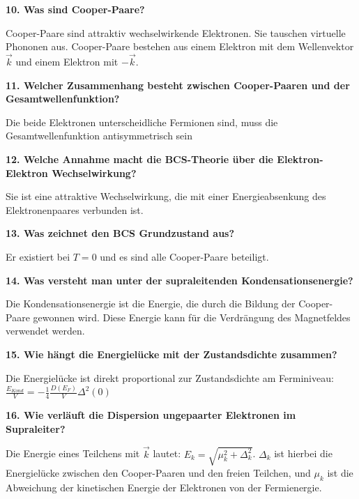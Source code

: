 \noindent\textbf{10. Was sind Cooper-Paare?}\\
\begin{addmargin}[25pt]{0pt}
Cooper-Paare sind attraktiv wechselwirkende Elektronen. Sie tauschen virtuelle Phononen aus. Cooper-Paare bestehen aus einem Elektron mit dem Wellenvektor $\vec{k}$ und einem Elektron mit $-\Vec{k}$.
\end{addmargin}

\noindent\textbf{11. Welcher Zusammenhang besteht zwischen Cooper-Paaren und der Gesamtwellenfunktion?}\\
\begin{addmargin}[25pt]{0pt}
Die beide Elektronen unterscheidliche Fermionen sind, muss die Gesamtwellenfunktion antisymmetrisch sein
\end{addmargin}

\noindent\textbf{12. Welche Annahme macht die BCS-Theorie über die Elektron-Elektron Wechselwirkung?}\\
\begin{addmargin}[25pt]{0pt}
Sie ist eine attraktive Wechselwirkung, die mit einer Energieabsenkung des Elektronenpaares verbunden ist.
\end{addmargin}

\noindent\textbf{13. Was zeichnet den BCS Grundzustand aus?}\\
\begin{addmargin}[25pt]{0pt}
Er existiert bei $T=0$ und es sind alle Cooper-Paare beteiligt.
\end{addmargin}

\noindent\textbf{14. Was versteht man unter der supraleitenden Kondensationsenergie?}\\
\begin{addmargin}[25pt]{0pt}
Die Kondensationsenergie ist die Energie, die durch die Bildung der Cooper-Paare gewonnen wird. Diese Energie kann für die Verdrängung des Magnetfeldes verwendet werden.
\end{addmargin}

\noindent\textbf{15. Wie hängt die Energielücke mit der Zustandsdichte zusammen?}\\
\begin{addmargin}[25pt]{0pt}
Die Energielücke ist direkt proportional zur Zustandsdichte am Ferminiveau: $\frac{E_{Kond}}{V}=-\frac{1}{4}\frac{D(E_F)}{V}\Delta^2(0)$
\end{addmargin}

\noindent\textbf{16. Wie verläuft die Dispersion ungepaarter Elektronen im Supraleiter?}\\
\begin{addmargin}[25pt]{0pt}
Die Energie eines Teilchens mit $\Vec{k}$ lautet: $E_k=\sqrt{\mu^2_k+\Delta^2_k}$. $\Delta_k$ ist hierbei die Energielücke zwischen den Cooper-Paaren und den freien Teilchen, und $\mu_k$ ist die Abweichung der kinetischen Energie der Elektronen von der Fermienergie.
\end{addmargin}

